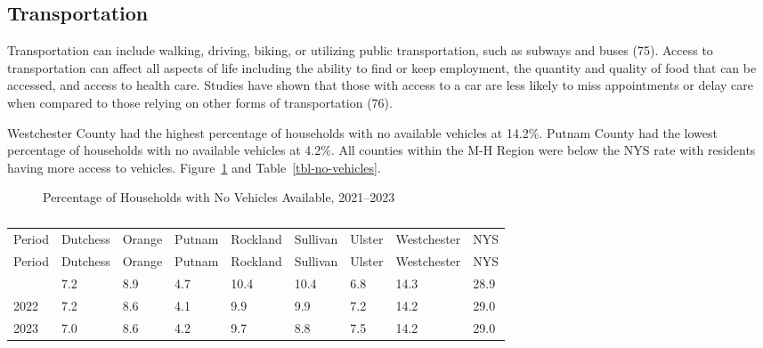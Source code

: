 \documentclass[
  english,
  letterpaper,
]{report}
\begin{document}
\subsection{Transportation}\label{transportation}

Transportation can include walking, driving, biking, or utilizing public
transportation, such as subways and buses (75). Access to transportation
can affect all aspects of life including the ability to find or keep
employment, the quantity and quality of food that can be accessed, and
access to health care. Studies have shown that those with access to a
car are less likely to miss appointments or delay care when compared to
those relying on other forms of transportation (76).

Westchester County had the highest percentage of households with no
available vehicles at 14.2\%. Putnam County had the lowest percentage of
households with no available vehicles at 4.2\%. All counties within the
M-H Region were below the NYS rate with residents having more access to
vehicles. Figure~\ref{fig-no-vehicles} and Table~\ref{tbl-no-vehicles}.

\begin{figure}


\caption{\label{fig-no-vehicles}Percentage of Households with No
Vehicles Available, 2021--2023}

\end{figure}%

\begin{longtable}[]{@{}lllllllll@{}}

\caption{\label{tbl-no-vehicles}Percentage of Households with No
Vehicles Available, 2021--2023}

\tabularnewline

\caption{}\label{T_523f7}\tabularnewline
\toprule\noalign{}
Period & Dutchess & Orange & Putnam & Rockland & Sullivan & Ulster &
Westchester & NYS \\
\midrule\noalign{}
\endfirsthead
\toprule\noalign{}
Period & Dutchess & Orange & Putnam & Rockland & Sullivan & Ulster &
Westchester & NYS \\
\midrule\noalign{}
\endhead
\bottomrule\noalign{}
\endlastfoot
2021 & 7.2 & 8.9 & 4.7 & 10.4 & 10.4 & 6.8 & 14.3 & 28.9 \\
2022 & 7.2 & 8.6 & 4.1 & 9.9 & 9.9 & 7.2 & 14.2 & 29.0 \\
2023 & 7.0 & 8.6 & 4.2 & 9.7 & 8.8 & 7.5 & 14.2 & 29.0 \\

\end{longtable}
\end{document}
